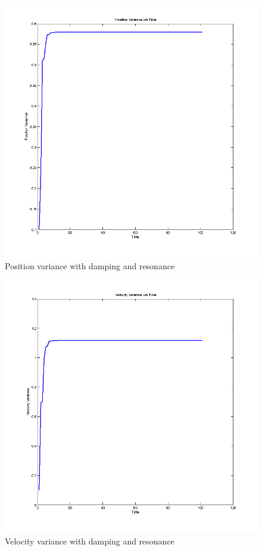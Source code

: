 \documentclass[12pt,english]{article}
\begin{document}
\begin{figure}
    \includegraphics[width=\linewidth]{kalman-variance1-damping}
    \caption{Position variance with damping and resonance}
\end{figure}

\begin{figure}
    \includegraphics[width=\linewidth]{kalman-variance2-damping}
    \caption{Velocity variance with damping and resonance}
\end{figure}
\end{document}
